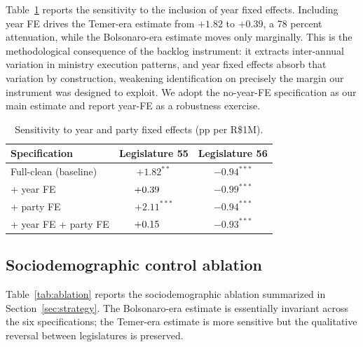 \documentclass[preprint,12pt,authoryear]{elsarticle}
\begin{document}
Table~\ref{tab:yearfe} reports the sensitivity to the inclusion of year fixed effects. Including year FE drives the Temer-era estimate from $+1.82$ to $+0.39$, a 78 percent attenuation, while the Bolsonaro-era estimate moves only marginally. This is the methodological consequence of the backlog instrument: it extracts inter-annual variation in ministry execution patterns, and year fixed effects absorb that variation by construction, weakening identification on precisely the margin our instrument was designed to exploit. We adopt the no-year-FE specification as our main estimate and report year-FE as a robustness exercise.

\begin{table}[htbp]
\centering
\caption{Sensitivity to year and party fixed effects (pp per R\$1M).}
\label{tab:yearfe}
\begin{threeparttable}
\small
\begin{tabular}{lcc}
\toprule
Specification & Legislature 55 & Legislature 56 \\
\midrule
Full-clean (baseline)                & $+1.82^{**}$  & $-0.94^{***}$ \\
\quad + year FE                      & $+0.39\hspace{1.4em}$ & $-0.99^{***}$ \\
\quad + party FE                     & $+2.11^{***}$ & $-0.94^{***}$ \\
\quad + year FE + party FE           & $+0.15\hspace{1.4em}$ & $-0.93^{***}$ \\
\bottomrule
\end{tabular}
\end{threeparttable}
\end{table}

\subsection{Sociodemographic control ablation}
\label{app:ablation}

Table~\ref{tab:ablation} reports the sociodemographic ablation summarized in Section~\ref{sec:strategy}. The Bolsonaro-era estimate is essentially invariant across the six specifications; the Temer-era estimate is more sensitive but the qualitative reversal between legislatures is preserved.
\end{document}
